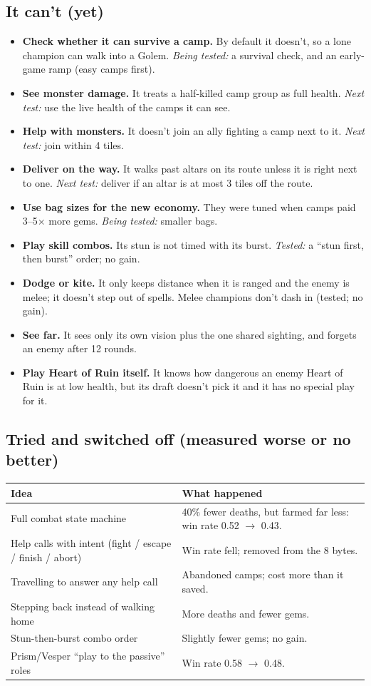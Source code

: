 \documentclass[11pt,a4paper]{article}
\begin{document}
\subsection*{It can't (yet)}
\begin{itemize}
\item \textbf{Check whether it can survive a camp.} By default it doesn't, so a lone champion can walk into
  a Golem. \emph{Being tested:} a survival check, and an early-game ramp (easy camps first).
\item \textbf{See monster damage.} It treats a half-killed camp group as full health. \emph{Next test:}
  use the live health of the camps it can see.
\item \textbf{Help with monsters.} It doesn't join an ally fighting a camp next to it. \emph{Next test:} join
  within 4 tiles.
\item \textbf{Deliver on the way.} It walks past altars on its route unless it is right next to one.
  \emph{Next test:} deliver if an altar is at most 3 tiles off the route.
\item \textbf{Use bag sizes for the new economy.} They were tuned when camps paid 3--5$\times$ more gems.
  \emph{Being tested:} smaller bags.
\item \textbf{Play skill combos.} Its stun is not timed with its burst. \emph{Tested:} a ``stun first, then
  burst'' order; no gain.
\item \textbf{Dodge or kite.} It only keeps distance when it is ranged and the enemy is melee; it doesn't
  step out of spells. Melee champions don't dash in (tested; no gain).
\item \textbf{See far.} It sees only its own vision plus the one shared sighting, and forgets an enemy
  after 12 rounds.
\item \textbf{Play Heart of Ruin itself.} It knows how dangerous an enemy Heart of Ruin is at low health,
  but its draft doesn't pick it and it has no special play for it.
\end{itemize}

\subsection*{Tried and switched off (measured worse or no better)}
\begin{tabularx}{\linewidth}{@{}lX@{}}
\toprule
Idea & What happened\\
\midrule
Full combat state machine & 40\% fewer deaths, but farmed far less: win rate 0.52 $\to$ 0.43.\\
Help calls with intent (fight / escape / finish / abort) & Win rate fell; removed from the 8 bytes.\\
Travelling to answer any help call & Abandoned camps; cost more than it saved.\\
Stepping back instead of walking home & More deaths and fewer gems.\\
Stun-then-burst combo order & Slightly fewer gems; no gain.\\
Prism/Vesper ``play to the passive'' roles & Win rate 0.58 $\to$ 0.48.\\
\bottomrule
\end{tabularx}
\end{document}
